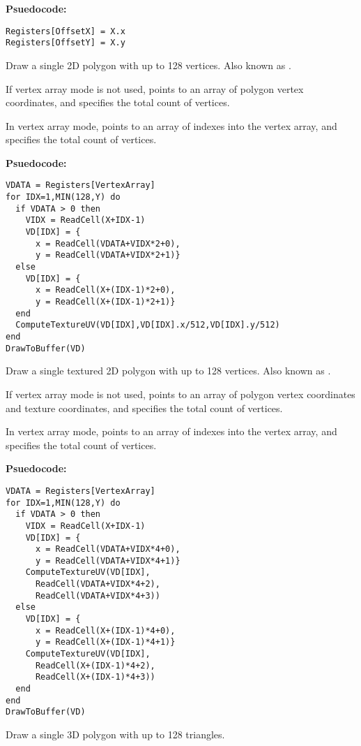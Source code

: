 \textbf{Psuedocode:}
\begin{verbatim}
Registers[OffsetX] = X.x
Registers[OffsetY] = X.y
\end{verbatim}


Draw a single 2D polygon with up to 128 vertices. Also known as .

If vertex array mode is not used,  points to an array of polygon vertex coordinates, and  specifies the total count of vertices.

In vertex array mode,  points to an array of indexes into the vertex array, and  specifies the total count of vertices.

\textbf{Psuedocode:}
\begin{verbatim}
VDATA = Registers[VertexArray]
for IDX=1,MIN(128,Y) do
  if VDATA > 0 then
    VIDX = ReadCell(X+IDX-1)
    VD[IDX] = {
      x = ReadCell(VDATA+VIDX*2+0),
      y = ReadCell(VDATA+VIDX*2+1)}
  else
    VD[IDX] = {
      x = ReadCell(X+(IDX-1)*2+0),
      y = ReadCell(X+(IDX-1)*2+1)}
  end
  ComputeTextureUV(VD[IDX],VD[IDX].x/512,VD[IDX].y/512)
end
DrawToBuffer(VD)
\end{verbatim}

Draw a single textured 2D polygon with up to 128 vertices. Also known as .

If vertex array mode is not used,  points to an array of polygon vertex coordinates and texture coordinates, and  specifies the total count of vertices.

In vertex array mode,  points to an array of indexes into the vertex array, and  specifies the total count of vertices.

\textbf{Psuedocode:}
\begin{verbatim}
VDATA = Registers[VertexArray]
for IDX=1,MIN(128,Y) do
  if VDATA > 0 then
    VIDX = ReadCell(X+IDX-1)
    VD[IDX] = {
      x = ReadCell(VDATA+VIDX*4+0),
      y = ReadCell(VDATA+VIDX*4+1)}
    ComputeTextureUV(VD[IDX],
      ReadCell(VDATA+VIDX*4+2),
      ReadCell(VDATA+VIDX*4+3))
  else
    VD[IDX] = {
      x = ReadCell(X+(IDX-1)*4+0),
      y = ReadCell(X+(IDX-1)*4+1)}      
    ComputeTextureUV(VD[IDX],
      ReadCell(X+(IDX-1)*4+2),
      ReadCell(X+(IDX-1)*4+3))
  end
end
DrawToBuffer(VD)
\end{verbatim}


Draw a single 3D polygon with up to 128 triangles.


